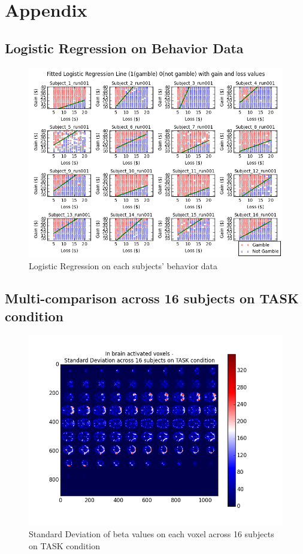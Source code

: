 \section {Appendix}
\subsection{Logistic Regression on Behavior Data}

\begin{figure}[H] 
\centering \includegraphics[scale=0.5]{../fig/log_reg_behav/log_regression_behav_subplots.png}	 
\caption{Logistic Regression on each subjects’ behavior data}
\end{figure} 

\subsection{Multi-comparison across 16 subjects on TASK condition}
\begin{figure}[H] 
\centering \includegraphics[scale=0.5]{../fig/multi_beta/std_task.png}	 
\caption{Standard Deviation of beta values on each voxel across 16 subjects on TASK condition}
\end{figure} 

